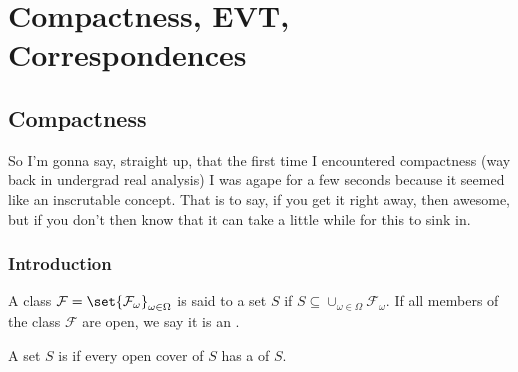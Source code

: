 \documentclass{article}
\begin{document}
\displayoptions

\section{Compactness, EVT, Correspondences}
\label{sec:compactness_evt_correspondences}

\localtableofcontents

\subsection{Compactness}
\label{sub:compactness}

So I'm gonna say, straight up, that the first time I encountered compactness (way back in undergrad real analysis) I was agape for a few seconds because it seemed like an inscrutable concept. That is to say, if you get it right away, then awesome, but if you don't then know that it can take a little while for this to sink in.

\subsubsection{Introduction}
\label{ssub:introduction}

\begin{definition}[cover]\label{def:lecture3_compactness_cover}
  A class $\mathcal{F} = \set{\mathcal{F}_\omega}_{\omega \in \Omega}$ is said to  a set $S$ if $S \subseteq \cup_{\omega \in \Omega} \mathcal{F}_\omega$. If all members of the class $\mathcal{F}$ are open, we say it is an .
\end{definition}

\begin{definition}[compactness]\label{def:lecture3_compactness_compact}
  A set $S$ is  if every open cover of $S$ has a  of $S$.
\end{definition}
\end{document}
